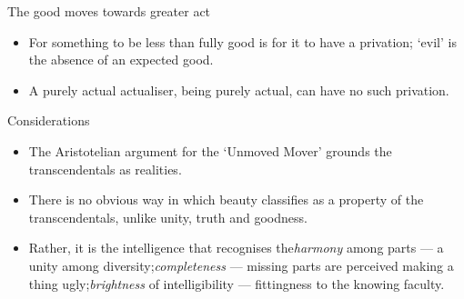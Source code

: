 \documentclass[xcolor=dvipsnames]{beamer}
\begin{document}
\begin{frame}[fragile]{The good moves towards greater act}
  \begin{itemize}
  \item For something to be less than fully good is for it to have a privation; `evil' is the absence of an expected good.\vspace{5mm}
  \item A purely actual actualiser, being purely actual, can have no such privation.\vspace{5mm}
  \end{itemize}
\end{frame}


\begin{frame}[fragile]{Considerations}
  \begin{itemize}
  \item The Aristotelian argument for the `Unmoved Mover' grounds the transcendentals as realities.\vspace{5mm}
  \item There is no obvious way in which beauty classifies as a property of the transcendentals, unlike unity, truth and goodness. \vspace{5mm}
  \item Rather, it is the intelligence that recognises the\newline \emph{harmony} among parts --- a unity among diversity;\newline \emph{completeness} --- missing parts are perceived making a thing ugly;\newline \emph{brightness} of intelligibility --- fittingness to the knowing faculty.
  \end{itemize}
\end{frame}


\begin{frame}[plain]
  \titlepage
\end{frame}
\end{document}
